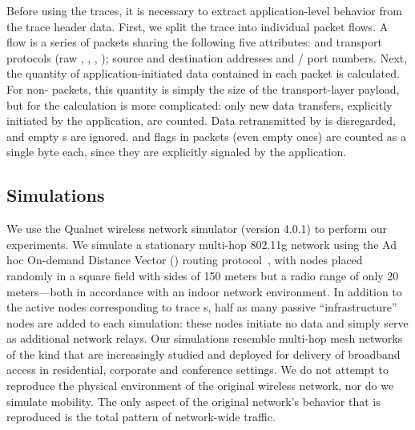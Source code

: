 \documentclass[twocolumn,final]{svjour3}
\begin{document}
Before using the traces, it is necessary to extract application-level behavior from the trace header data. First, we split the trace into individual packet flows. A flow is a series of packets sharing the following five attributes:  and transport protocols (raw , , , ); source and destination  addresses and / port numbers. Next, the quantity of application-initiated data contained in each packet is calculated. For non- packets, this quantity is simply the size of the transport-layer payload, but for  the calculation is more complicated: only new data transfers, explicitly initiated by the application, are counted. Data retransmitted by  is disregarded, and empty s are ignored.  and  flags in packets (even empty ones) are counted as a single byte each, since they are explicitly signaled by the application. %

\subsection{Simulations}
\label{sec:simulations}

We use the Qualnet wireless network simulator (version 4.0.1) to perform our experiments. We simulate a stationary multi-hop 802.11g network using the Ad hoc On-demand Distance Vector () routing protocol~\cite{rfc:aodv}, with nodes placed randomly in a square field with sides of 150 meters but a radio range of only 20 meters---both in accordance with an indoor network environment.
In addition to the active nodes corresponding to trace s, half as many passive ``infrastructure'' nodes are added to each simulation: these nodes initiate no data and simply serve as additional network relays. Our simulations resemble multi-hop mesh networks of the kind that are increasingly studied and deployed for delivery of broadband access in residential, corporate and conference settings. We do not attempt to reproduce the physical environment of the original wireless network, nor do we simulate mobility. The only aspect of the original network's behavior that is reproduced is the total pattern of network-wide traffic.
\end{document}
